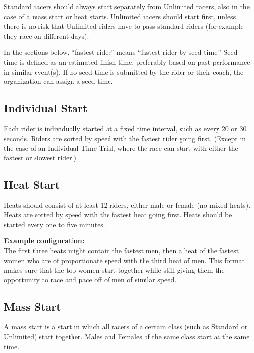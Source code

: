 Standard racers should always start separately from Unlimited racers, also in the case of a mass start or heat starts.
Unlimited racers should start first, unless there is no risk that Unlimited riders have to pass standard riders (for example they race on different days).

In the sections below, ``fastest rider'' means ``fastest rider by seed time.'' Seed time is defined as an estimated finish time, preferably based on past performance in similar event(s).
If no seed time is submitted by the rider or their coach, the organization can assign a seed time.

\subsection{Individual Start \label{subsec:road_heat-assignment_individual-start}}

Each rider is individually started at a fixed time interval, such as every 20 or 30 seconds.
Riders are sorted by speed with the fastest rider going first.
(Except in the case of an Individual Time Trial, where the race can start with either the fastest or slowest rider.)

\subsection{Heat Start \label{subsec:road_heat-assignment_heat-start}}

Heats should consist of at least 12 riders, either male or female (no mixed heats).%
Heats are sorted by speed with the fastest heat going first.
Heats should be started every one to five minutes.

\textbf{Example configuration:}\\
The first three heats might contain the fastest men, then a heat of the fastest women who are of proportionate speed with the third heat of men.
This format makes sure that the top women start together while still giving them the opportunity to race and pace off of men of similar speed.

\subsection{Mass Start \label{subsec:road_heat-assignment_mass-start}}

A mass start is a start in which all racers of a certain class (such as Standard or Unlimited) start together.
Males and Females of the same class start at the same time.

